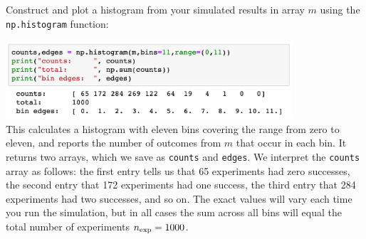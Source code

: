 \begin{plot} Construct and plot a histogram from your simulated results in array $m$ using the 
{\tt np.histogram} function: \end{plot}
\includegraphics[width=0.8\textwidth]{figs/labs/distributions/makehist.png}\\ 
This calculates a histogram with eleven bins covering the range
from zero to eleven, and reports the number of outcomes from $m$ that
occur in each bin.  It returns two arrays, which we save as 
{\tt counts} and {\tt edges}.  We interpret the {\tt counts} array as
follows: the first entry tells us that 65 experiments had zero
successes, the second entry that 172 experiments had one success, the
third entry that 284 experiments had two successes, and so on.  The
exact values will vary each time you run the simulation, but in all
cases the sum across all bins will equal the total number of
experiments $n_{\rm exp} = 1000$.

